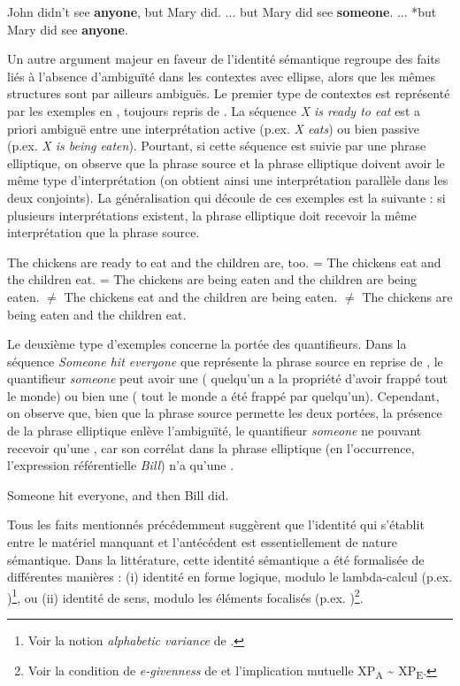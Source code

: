 \ea
John didn’t see \textbf{anyone}, but Mary did. \citep[157]{Sag1976} \label{ch1:ex147}
\ea  ... but Mary did see \textbf{someone}. 
\ex  ... *but Mary did see \textbf{anyone}.
\z
\z

Un autre argument majeur en faveur de l’identité sémantique regroupe des faits liés à l’absence d’ambiguïté dans les contextes avec ellipse, alors que les mêmes structures sont par ailleurs ambiguës. Le premier type de contextes est représenté par les exemples en , toujours repris de \citet{Sag1976}. La séquence \textit{X is ready to eat} est a priori ambiguë entre une interprétation active (p.ex. \textit{X eats}) ou bien passive (p.ex. \textit{X is being eaten}). Pourtant, si cette séquence est suivie par une phrase elliptique, on observe que la phrase source et la phrase elliptique doivent avoir le même type d’interprétation (on obtient ainsi une interprétation parallèle dans les deux conjoints). La généralisation qui découle de ces exemples est la suivante : si plusieurs interprétations existent, la phrase elliptique doit recevoir la même interprétation que la phrase source.

\ea
The chickens are ready to eat and the children are, too. \citep[533]{Sag1976} \label{ch1:ex148}
\ea = The chickens eat and the children eat. 
\ex = The chickens are being eaten and the children are being eaten.
\ex ${\neq}$ The chickens eat and the children are being eaten.
\ex ${\neq}$ The chickens are being eaten and the children eat.
\z
\z

Le deuxième type d’exemples concerne la portée des quantifieurs. Dans la séquence \textit{Someone hit everyone} que représente la phrase source en  reprise de \citet{Sag1976}, le quantifieur \textit{someone} peut avoir une  ({\cad} quelqu’un a la propriété d’avoir frappé tout le monde) ou bien une  ({\cad} tout le monde a été frappé par quelqu’un). Cependant, on observe que, bien que la phrase source permette les deux portées, la présence de la phrase elliptique enlève l’ambiguïté, le quantifieur \textit{someone} ne pouvant recevoir qu’une , car son corrélat dans la phrase elliptique (en l’occurrence, l’expression référentielle \textit{Bill}) n’a qu’une .

\ea
Someone hit everyone, and then Bill did. \citep[61]{Sag1976} \label{ch1:ex149} 
\z

Tous les faits mentionnés précédemment suggèrent que l’identité qui s’établit entre le matériel manquant et l’antécédent est essentiellement de nature sémantique. Dans la littérature, cette identité sémantique a été formalisée de différentes manières : (i) identité en forme logique, modulo le lambda-calcul (p.ex. \citealt{Sag1976,Williams1977})\footnote{Voir la notion \textit{alphabetic variance} de \citet{Sag1976}.}, ou (ii) identité de sens, modulo les éléments focalisés (p.ex. \citealt{Merchant2001,Merchant2004})\footnote{Voir la condition de \textit{e-givenness} de \citet{Merchant2001,Merchant2006} et l’implication mutuelle XP\textsubscript{A} {\textasciitilde} XP\textsubscript{E}.}.~


